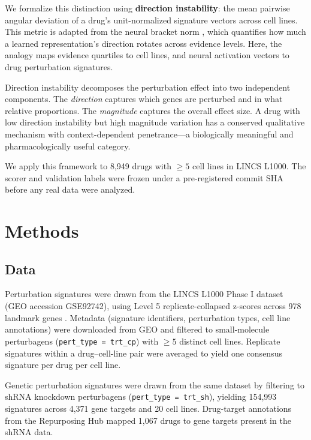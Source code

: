 \documentclass{article}
\begin{document}
We formalize this distinction using \textbf{direction instability}: the mean
pairwise angular deviation of a drug's unit-normalized signature vectors
across cell lines. This metric is adapted from the neural bracket norm
\citep{tower2026bracket}, which quantifies how much a learned representation's
direction rotates across evidence levels. Here, the analogy maps evidence
quartiles to cell lines, and neural activation vectors to drug perturbation
signatures.

Direction instability decomposes the perturbation effect into two independent
components. The \emph{direction} captures which genes are perturbed and in
what relative proportions. The \emph{magnitude} captures the overall effect
size. A drug with low direction instability but high magnitude variation has
a conserved qualitative mechanism with context-dependent penetrance---a
biologically meaningful and pharmacologically useful category.

We apply this framework to 8{,}949 drugs with $\geq5$ cell lines in LINCS
L1000. The scorer and validation labels were frozen under a pre-registered
commit SHA before any real data were analyzed.

\section{Methods}

\subsection{Data}

Perturbation signatures were drawn from the LINCS L1000 Phase I dataset
(GEO accession GSE92742), using Level 5 replicate-collapsed z-scores across
978 landmark genes \citep{subramanian2017next}. Metadata (signature
identifiers, perturbation types, cell line annotations) were downloaded from
GEO and filtered to small-molecule perturbagens (\texttt{pert\_type =
trt\_cp}) with $\geq5$ distinct cell lines. Replicate signatures within a
drug--cell-line pair were averaged to yield one consensus signature per
drug per cell line.

Genetic perturbation signatures were drawn from the same dataset by
filtering to shRNA knockdown perturbagens (\texttt{pert\_type = trt\_sh}),
yielding 154{,}993 signatures across 4{,}371 gene targets and 20 cell lines.
Drug-target annotations from the Repurposing Hub mapped 1{,}067 drugs to
gene targets present in the shRNA data.
\end{document}
